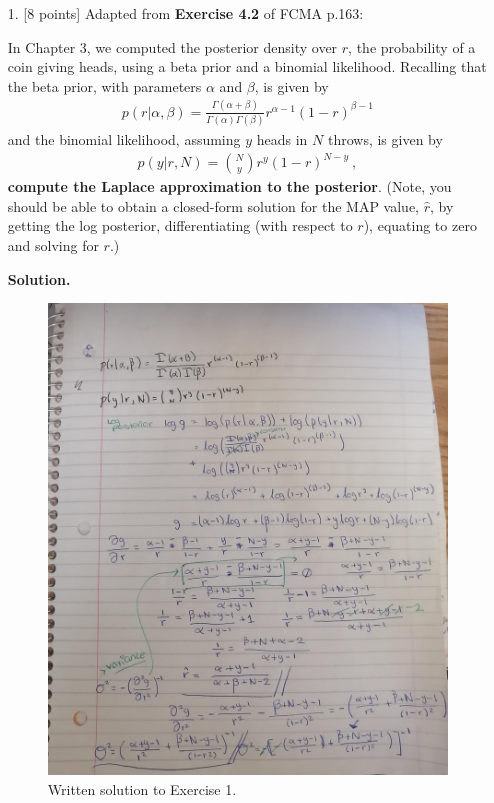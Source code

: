 \documentclass[10pt]{article}
\begin{document}
\newpage
\begin{itemize}


\item[1.]  [8 points]
Adapted from {\bf Exercise 4.2} of FCMA p.163:

In Chapter 3, we computed the posterior density over $r$, the probability of a coin giving heads, using a beta prior and a binomial likelihood.  Recalling that the beta prior, with parameters $\alpha$ and $\beta$, is given by
\begin{eqnarray*}
p(r | \alpha, \beta) = \frac{\Gamma(\alpha + \beta)}{\Gamma(\alpha) \Gamma(\beta)} r^{\alpha - 1} (1 - r)^{\beta - 1}
\end{eqnarray*}
and the binomial likelihood, assuming $y$ heads in $N$ throws, is given by
\begin{eqnarray*}
p(y | r, N) = {N \choose y} r^{y} (1 - r)^{N-y} ~,
\end{eqnarray*}
{\bf compute the Laplace approximation to the posterior}.  (Note, you should be able to obtain a closed-form solution for the MAP value, $\hat{r}$, by getting the log posterior, differentiating (with respect to $r$), equating to zero and solving for $r$.)

{\bf Solution.}
\begin{figure}[H]
\begin{center}
\includegraphics[width=.7\textwidth]{figures/ex1.jpeg}
\caption{Written solution to Exercise 1.}
\end{center}
\end{figure}



\end{itemize}
\end{document}
